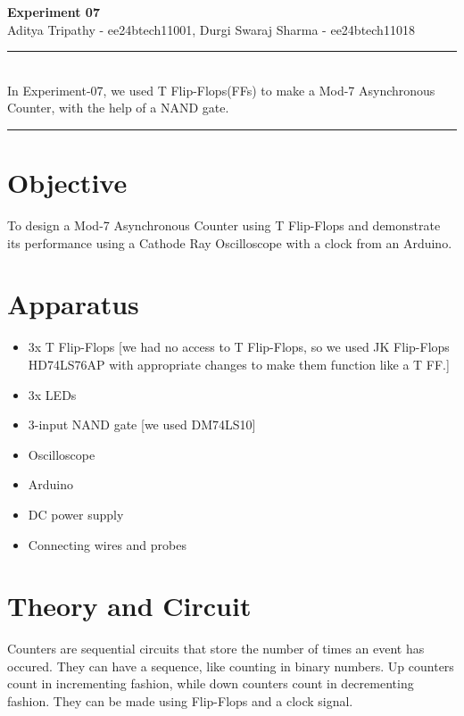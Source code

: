 \documentclass[a4paper,12pt]{article}
\renewenvironment{abstract}
{\par\noindent\textbf{\abstractname}\ \ignorespaces \\}
{\par\noindent\medskip}
\begin{document}
\pagestyle{fancy}
\thispagestyle{empty}
\fancyhead[L]{}
\renewcommand*{\thefootnote}{\fnsymbol{footnote}}
\begin{center}
    \Large{\textbf{Experiment 07}}
    \vspace{0.4cm}
    \normalsize
    \\ Aditya Tripathy - ee24btech11001, Durgi Swaraj Sharma - ee24btech11018\\
    \medskip
    \normalsize
\end{center}
{\color{gray}\hrule}
\vspace{0.4cm}
\begin{abstract}
    In Experiment-07, we used T Flip-Flops(FFs) to make a Mod-7 Asynchronous Counter, with the help of a NAND gate. 
\end{abstract}
{\color{gray}\hrule}
\medskip
\section{Objective}
To design a Mod-7 Asynchronous Counter using T Flip-Flops and demonstrate its performance using a Cathode Ray Oscilloscope with a clock from an Arduino.
\section{Apparatus}
\begin{itemize}
    \item 3x T Flip-Flops [we had no access to T Flip-Flops, so we used JK Flip-Flops HD74LS76AP with appropriate changes to make them function like a T FF.]
    \item 3x LEDs
    \item 3-input NAND gate [we used DM74LS10]
    \item Oscilloscope
    \item Arduino
    \item DC power supply
    \item Connecting wires and probes
\end{itemize}
\section{Theory and Circuit}

Counters are sequential circuits that store the number of times an event has occured. They can have a sequence, like counting in binary numbers. Up counters count in incrementing fashion, while down counters count in decrementing fashion. They can be made using Flip-Flops and a clock signal.  
\end{document}

